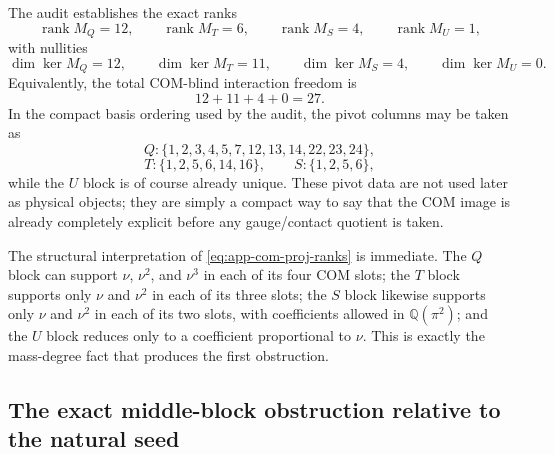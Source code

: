 \documentclass[11pt]{article}
\begin{document}
The audit establishes the exact ranks
\begin{equation}
\operatorname{rank}M_Q=12,
\qquad
\operatorname{rank}M_T=6,
\qquad
\operatorname{rank}M_S=4,
\qquad
\operatorname{rank}M_U=1,
\label{eq:app-com-proj-ranks}
\end{equation}
with nullities
\begin{equation}
\dim\ker M_Q=12,
\qquad
\dim\ker M_T=11,
\qquad
\dim\ker M_S=4,
\qquad
\dim\ker M_U=0.
\label{eq:app-com-proj-nullities}
\end{equation}
Equivalently, the total COM-blind interaction freedom is
\begin{equation}
\boxed{12+11+4+0=27.}
\label{eq:app-com-proj-total-nullity}
\end{equation}
In the compact basis ordering used by the audit, the pivot columns may be taken
as
\begin{equation}
Q:\{1,2,3,4,5,7,12,13,14,22,23,24\},
\label{eq:app-com-proj-Q-pivots}
\end{equation}
\begin{equation}
T:\{1,2,5,6,14,16\},
\qquad
S:\{1,2,5,6\},
\label{eq:app-com-proj-TS-pivots}
\end{equation}
while the $U$ block is of course already unique.  These pivot data are not used
later as physical objects; they are simply a compact way to say that the COM
image is already completely explicit before any gauge/contact quotient is taken.

The structural interpretation of \eqref{eq:app-com-proj-ranks} is immediate.
The $Q$ block can support $\nu$, $\nu^2$, and $\nu^3$ in each of its four COM
slots; the $T$ block supports only $\nu$ and $\nu^2$ in each of its three slots;
the $S$ block likewise supports only $\nu$ and $\nu^2$ in each of its two slots,
with coefficients allowed in $\mathbb Q(\pi^2)$; and the $U$ block reduces only
to a coefficient proportional to $\nu$.  This is exactly the mass-degree fact
that produces the first obstruction.

\subsection{The exact middle-block obstruction relative to the natural seed}
\label{app:com-proj-obstruction}
\end{document}

